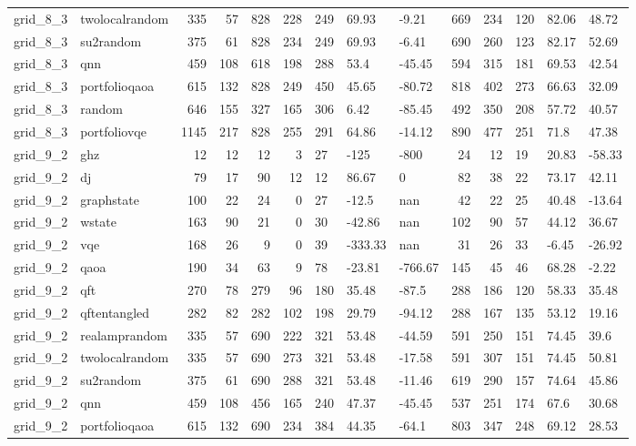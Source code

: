 \begin{longtable}{llrrrrlllrrlll}
grid\_8\_3 & twolocalrandom & 335 & 57 & 828 & 228 & 249 & 69.93 & -9.21 & 669 & 234 & 120 & 82.06 & 48.72 \\
grid\_8\_3 & su2random & 375 & 61 & 828 & 234 & 249 & 69.93 & -6.41 & 690 & 260 & 123 & 82.17 & 52.69 \\
grid\_8\_3 & qnn & 459 & 108 & 618 & 198 & 288 & 53.4 & -45.45 & 594 & 315 & 181 & 69.53 & 42.54 \\
grid\_8\_3 & portfolioqaoa & 615 & 132 & 828 & 249 & 450 & 45.65 & -80.72 & 818 & 402 & 273 & 66.63 & 32.09 \\
grid\_8\_3 & random & 646 & 155 & 327 & 165 & 306 & 6.42 & -85.45 & 492 & 350 & 208 & 57.72 & 40.57 \\
grid\_8\_3 & portfoliovqe & 1145 & 217 & 828 & 255 & 291 & 64.86 & -14.12 & 890 & 477 & 251 & 71.8 & 47.38 \\
grid\_9\_2 & ghz & 12 & 12 & 12 & 3 & 27 & -125 & -800 & 24 & 12 & 19 & 20.83 & -58.33 \\
grid\_9\_2 & dj & 79 & 17 & 90 & 12 & 12 & 86.67 & 0 & 82 & 38 & 22 & 73.17 & 42.11 \\
grid\_9\_2 & graphstate & 100 & 22 & 24 & 0 & 27 & -12.5 & nan & 42 & 22 & 25 & 40.48 & -13.64 \\
grid\_9\_2 & wstate & 163 & 90 & 21 & 0 & 30 & -42.86 & nan & 102 & 90 & 57 & 44.12 & 36.67 \\
grid\_9\_2 & vqe & 168 & 26 & 9 & 0 & 39 & -333.33 & nan & 31 & 26 & 33 & -6.45 & -26.92 \\
grid\_9\_2 & qaoa & 190 & 34 & 63 & 9 & 78 & -23.81 & -766.67 & 145 & 45 & 46 & 68.28 & -2.22 \\
grid\_9\_2 & qft & 270 & 78 & 279 & 96 & 180 & 35.48 & -87.5 & 288 & 186 & 120 & 58.33 & 35.48 \\
grid\_9\_2 & qftentangled & 282 & 82 & 282 & 102 & 198 & 29.79 & -94.12 & 288 & 167 & 135 & 53.12 & 19.16 \\
grid\_9\_2 & realamprandom & 335 & 57 & 690 & 222 & 321 & 53.48 & -44.59 & 591 & 250 & 151 & 74.45 & 39.6 \\
grid\_9\_2 & twolocalrandom & 335 & 57 & 690 & 273 & 321 & 53.48 & -17.58 & 591 & 307 & 151 & 74.45 & 50.81 \\
grid\_9\_2 & su2random & 375 & 61 & 690 & 288 & 321 & 53.48 & -11.46 & 619 & 290 & 157 & 74.64 & 45.86 \\
grid\_9\_2 & qnn & 459 & 108 & 456 & 165 & 240 & 47.37 & -45.45 & 537 & 251 & 174 & 67.6 & 30.68 \\
grid\_9\_2 & portfolioqaoa & 615 & 132 & 690 & 234 & 384 & 44.35 & -64.1 & 803 & 347 & 248 & 69.12 & 28.53 \\

\end{longtable}
